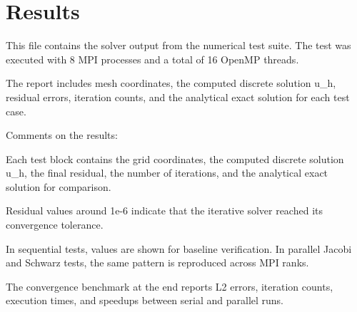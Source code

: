 \chapter{Results}
\hypertarget{md_results}{}\label{md_results}
\label{md_results_autotoc_md20}%
%
 This file contains the solver output from the numerical test suite. The test was executed with 8 MPI processes and a total of 16 Open\+MP threads.

The report includes mesh coordinates, the computed discrete solution {\ttfamily u\+\_\+h}, residual errors, iteration counts, and the analytical exact solution for each test case.

Comments on the results\+:


\begin{DoxyItemize}
\item Each test block contains the grid coordinates, the computed discrete solution {\ttfamily u\+\_\+h}, the final residual, the number of iterations, and the analytical exact solution for comparison.
\item Residual values around {\ttfamily 1e-\/6} indicate that the iterative solver reached its convergence tolerance.
\item In sequential tests, values are shown for baseline verification. In parallel Jacobi and Schwarz tests, the same pattern is reproduced across MPI ranks.
\item The convergence benchmark at the end reports L2 errors, iteration counts, execution times, and speedups between serial and parallel runs.
\end{DoxyItemize}


